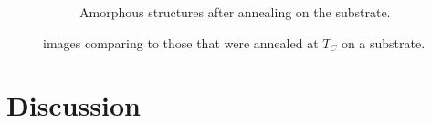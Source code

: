 \begin{figure}
\begin{subfigure}{1\textwidth}
	\caption{Amorphous structures after annealing on the substrate.}
	\label{fig:semnanosoup}
\end{subfigure}
\caption{\sem{} images comparing  \pvdf{} \nps{} to those that were annealed at $T_C$ on a substrate.}
\label{fig:semnps}
\end{figure}

\subsection{\dls{}}


\section{Discussion}